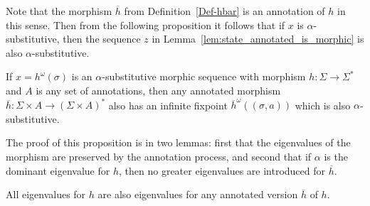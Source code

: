 Note that the morphism $\overline{h}$ from Definition~\ref{Def-hbar} is an annotation of $h$ in this sense.
Then from the following proposition it follows that if $x$ is $\alpha$-substitutive,
then the sequence $z$ in Lemma~\ref{lem:state_annotated_is_morphic} is also $\alpha$-substitutive. 

\begin{proposition}
If $x = h^\omega(\sigma)$ is an $\alpha$-substitutive morphic sequence with morphism $h: \Sigma \to \Sigma^*$ and $A$ is any set of annotations, then any annotated morphism $\overline{h}: \Sigma \times A \to (\Sigma \times A)^*$ also has an infinite fixpoint $\overline{h}^\omega((\sigma,a))$ which is also $\alpha$-substitutive.
\end{proposition}

The proof of this proposition is in two lemmas: first that the eigenvalues of 
the morphism are preserved by the annotation process, and second that if $\alpha$ is the
 dominant eigenvalue for $h$, then no greater eigenvalues are introduced for $\overline{h}$.

\begin{lemma}\label{lem:h:oh}
  All eigenvalues for $h$ are also eigenvalues for any annotated version $\overline{h}$ of $h$.
\end{lemma}

